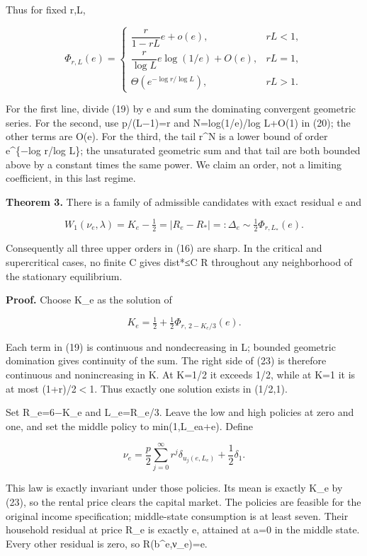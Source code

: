 \documentclass{article}
\begin{document}
Thus for fixed r,L,

\[
\Phi_{r,L}(e)=
\begin{cases}
\dfrac{r}{1-rL}e+o(e),&rL<1,\\[4pt]
\dfrac{r}{\log L}e\log(1/e)+O(e),&rL=1,\\[4pt]
\Theta(e^{-\log r/\log L}),&rL>1.
\end{cases}
\tag{21}
\]

For the first line, divide (19) by e and sum the dominating convergent geometric series. For the second, use p/(L−1)=r and N=log(1/e)/log L+O(1) in (20); the other terms are O(e). For the third, the tail r\^{}N is a lower bound of order e\^{}\{−log r/log L\}; the unsaturated geometric sum and that tail are both bounded above by a constant times the same power. We claim an order, not a limiting coefficient, in this last regime.

\textbf{Theorem 3.} There is a family of admissible candidates with exact residual e and

\[
W_1(\nu_e,\lambda)
=K_e-\tfrac12
=|R_e-R_*|
=:\Delta_e
\sim \tfrac12\Phi_{r,L_*}(e).
\tag{22}
\]

Consequently all three upper orders in (16) are sharp. In the critical and supercritical cases, no finite C gives dist*≤C R throughout any neighborhood of the stationary equilibrium.

\textbf{Proof.} Choose K\_e as the solution of

\[
K_e=\tfrac12+\tfrac12\Phi_{r,\,2-K_e/3}(e).
\tag{23}
\]

Each term in (19) is continuous and nondecreasing in L; bounded geometric domination gives continuity of the sum. The right side of (23) is therefore continuous and nonincreasing in K. At K=1/2 it exceeds 1/2, while at K=1 it is at most (1+r)/2\(\lt\)1. Thus exactly one solution exists in (1/2,1).

Set R\_e=6−K\_e and L\_e=R\_e/3. Leave the low and high policies at zero and one, and set the middle policy to min(1,L\_ea+e). Define

\[
\nu_e=\frac p2\sum_{j=0}^{\infty}r^j
\delta_{u_j(e,L_e)}+\frac12\delta_1.
\tag{24}
\]

This law is exactly invariant under those policies. Its mean is exactly K\_e by (23), so the rental price clears the capital market. The policies are feasible for the original income specification; middle-state consumption is at least seven. Their household residual at price R\_e is exactly e, attained at a=0 in the middle state. Every other residual is zero, so R(b\^{}e,ν\_e)=e.
\end{document}
